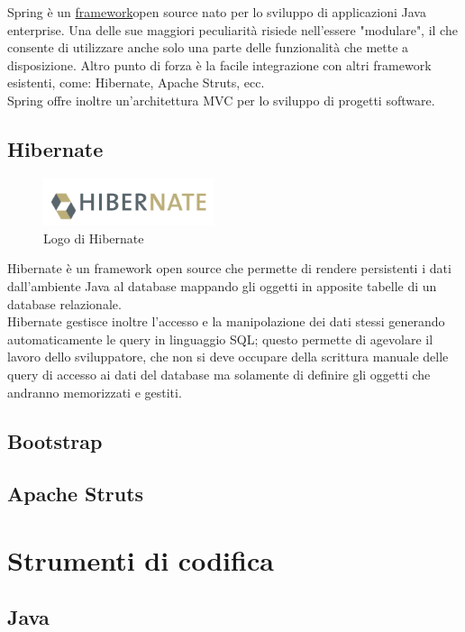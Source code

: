 \noindent Spring è un {\hyperref[cap:framework-definition]{framework}}\glsfirstoccur open source nato per lo sviluppo di applicazioni Java enterprise. Una delle sue maggiori peculiarità risiede nell'essere "modulare", il che consente di utilizzare anche solo una parte delle funzionalità che mette a disposizione. Altro punto di forza è la facile integrazione con altri framework esistenti, come: Hibernate, Apache Struts, ecc. \\
Spring offre inoltre un'architettura MVC per lo sviluppo di progetti software.

\subsection{Hibernate}

\begin{figure}[!h]
	\centering
	\includegraphics[width=5cm]{../images/Hibernate-logo.png}
	\caption{Logo di Hibernate}
\end{figure}

\noindent Hibernate è un framework open source che permette di  rendere persistenti i dati dall'ambiente Java al database mappando gli oggetti in apposite tabelle di un database relazionale. \\
Hibernate gestisce inoltre l'accesso e la manipolazione dei dati stessi generando automaticamente le query in linguaggio SQL; questo permette di agevolare il lavoro dello sviluppatore, che non si deve occupare della scrittura manuale delle query di accesso ai dati del database ma solamente di definire gli oggetti che andranno memorizzati e gestiti.

\subsection{Bootstrap}


\subsection{Apache Struts}


\section{Strumenti di codifica}
\subsection{Java}

